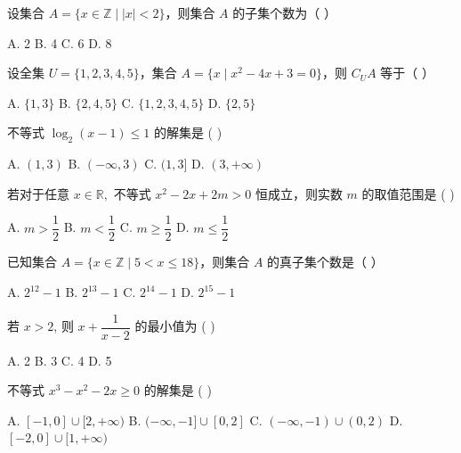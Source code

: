 \documentclass[11pt, a4paper]{article}
\begin{document}
\begin{baitap}[19]
设集合 $A=\{x\in\mathbb{Z}\mid |x|<2\}$，则集合 $A$ 的子集个数为（ ）
\par\vspace{3pt}
\noindent A. 2 \quad B. 4 \quad C. 6 \quad D. 8
\end{baitap}

\begin{baitap}[20]
设全集 $U=\{1,2,3,4,5\}$，集合 $A=\{x\mid x^2-4x+3=0\}$，则 $C_UA$ 等于（ ）
\par\vspace{3pt}
\noindent A. $\{1,3\}$ \quad B. $\{2,4,5\}$ \quad C. $\{1,2,3,4,5\}$ \quad D. $\{2,5\}$
\end{baitap}

\begin{baitap}[21]
不等式 $\log_{2}(x - 1) \le 1$ 的解集是 ( )
\par\vspace{3pt}
\noindent A. $(1,3)$ \quad B. $(-\infty, 3)$ \quad C. $(1,3]$ \quad D. $(3, +\infty)$
\end{baitap}

\begin{baitap}[22]
若对于任意 $x \in \mathbb{R},$ 不等式 $x^2 - 2x + 2m > 0$ 恒成立，则实数 $m$ 的取值范围是 ( )
\par\vspace{3pt}
\noindent A. $m > \dfrac{1}{2}$ \quad B. $m < \dfrac{1}{2}$ \quad C. $m \ge \dfrac{1}{2}$ \quad D. $m \le \dfrac{1}{2}$
\end{baitap}

\begin{baitap}[23]
已知集合 $A=\{x\in\mathbb Z\mid 5<x\le18\}$，则集合 $A$ 的真子集个数是（ ）
\par\vspace{3pt}
\noindent A. $2^{12}-1$ \quad B. $2^{13}-1$ \quad C. $2^{14}-1$ \quad D. $2^{15}-1$
\end{baitap}

\begin{baitap}[24]
若 $x > 2$, 则 $x + \dfrac{1}{x-2}$ 的最小值为 ( )
\par\vspace{3pt}
\noindent A. 2 \quad B. 3 \quad C. 4 \quad D. 5
\end{baitap}

\begin{baitap}[25]
不等式 $x^3 - x^2 - 2x \ge 0$ 的解集是 ( )
\par\vspace{3pt}
\noindent A. $[-1,0] \cup [2, +\infty)$ \quad B. $(-\infty, -1] \cup [0,2]$ \quad C. $(-\infty, -1) \cup (0,2)$ \quad D. $[-2,0] \cup [1, +\infty)$
\end{baitap}
\end{document}
